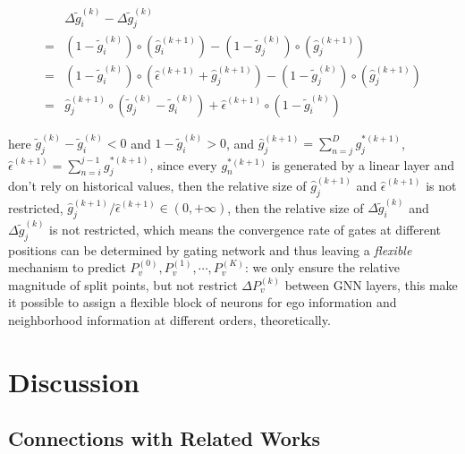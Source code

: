 \documentclass{article}
\begin{document}
\begin{equation}
\begin{aligned}
&\Delta \tilde{g}_{i}^{(k)} - \Delta \tilde{g}_{j}^{(k)}\\
=& (1-\tilde{g}_{i}^{(k)}) \circ (\hat{g}_{i}^{(k+1)}) - (1-\tilde{g}_{j}^{(k)}) \circ (\hat{g}_{j}^{(k+1)})\\
=& (1-\tilde{g}_{i}^{(k)}) \circ (\hat{\epsilon}^{(k+1)} + \hat{g}_{j}^{(k+1)}) - (1-\tilde{g}_{j}^{(k)}) \circ (\hat{g}_{j}^{(k+1)})\\
=& \hat{g}_{j}^{(k+1)} \circ (\tilde{g}_{j}^{(k)} - \tilde{g}_{i}^{(k)}) + \hat{\epsilon}^{(k+1)} \circ (1-\tilde{g}_{i}^{(k)})
\end{aligned}
\end{equation}

here $\tilde{g}_{j}^{(k)} - \tilde{g}_{i}^{(k)}<0$ and $1-\tilde{g}_{i}^{(k)}>0$, and $\hat{g}_{j}^{(k+1)}=\sum_{n=j}^{D} g_{j}^{*(k+1)}$, $\hat{\epsilon}^{(k+1)}=\sum_{n=i}^{j-1} g_{j}^{*(k+1)}$, since every $g_{n}^{*(k+1)}$ is generated by a linear layer and don't rely on historical values, then the relative size of $\hat{g}_{j}^{(k+1)}$ and $\hat{\epsilon}^{(k+1)}$ is not restricted, $\hat{g}_{j}^{(k+1)}/\hat{\epsilon}^{(k+1)} \in (0,+\infty)$, then the relative size of $\Delta \tilde{g}_{i}^{(k)}$ and $\Delta \tilde{g}_{j}^{(k)}$ is not restricted, which means the convergence rate of gates at different positions can be determined by gating network and thus leaving a \textit{flexible} mechanism to predict $P_v^{(0)} , P_v^{(1)}, \cdots, P_v^{(K)}$: we only ensure the relative magnitude of split points, but not restrict $\Delta P_v^{(k)}$ between GNN layers, this make it possible to assign a flexible block of neurons for ego information and neighborhood information at different orders, theoretically.




\section{Discussion}
\label{Discussion}
\subsection{Connections with Related Works}
\end{document}
